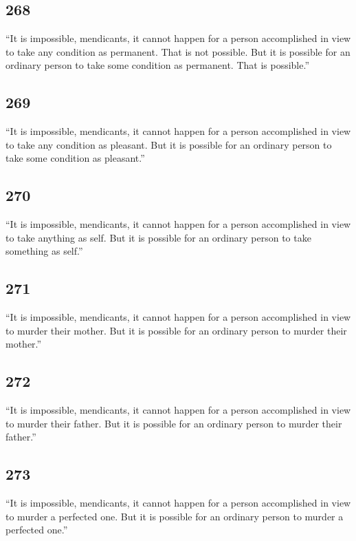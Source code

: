 \documentclass[12pt,openany]{book}%
\begin{document}
\subsection*{268 }

“It is impossible, mendicants, it cannot happen for a person accomplished in view to take any condition as permanent. That is not possible. But it is possible for an ordinary person to take some condition as permanent. That is possible.” 

\subsection*{269 }

“It is impossible, mendicants, it cannot happen for a person accomplished in view to take any condition as pleasant. But it is possible for an ordinary person to take some condition as pleasant.” 

\subsection*{270 }

“It is impossible, mendicants, it cannot happen for a person accomplished in view to take anything as self. But it is possible for an ordinary person to take something as self.” 

\subsection*{271 }

“It is impossible, mendicants, it cannot happen for a person accomplished in view to murder their mother. But it is possible for an ordinary person to murder their mother.” 

\subsection*{272 }

“It is impossible, mendicants, it cannot happen for a person accomplished in view to murder their father. But it is possible for an ordinary person to murder their father.” 

\subsection*{273 }

“It is impossible, mendicants, it cannot happen for a person accomplished in view to murder a perfected one. But it is possible for an ordinary person to murder a perfected one.” 
\end{document}
